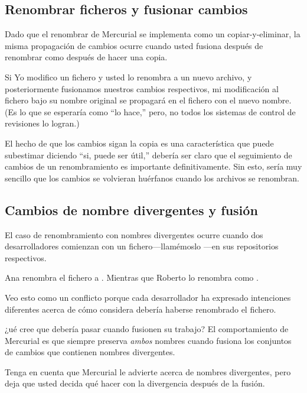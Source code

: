 \subsection{Renombrar ficheros y fusionar cambios}

Dado que el renombrar de Mercurial se implementa como un
copiar-y-eliminar, la misma propagación de cambios ocurre cuando usted
fusiona después de renombrar como después de hacer una copia.

Si Yo modifico un fichero y usted lo renombra a un nuevo archivo, y
posteriormente fusionamos nuestros cambios respectivos, mi
modificación al fichero bajo su nombre original se propagará en el
fichero con el nuevo nombre. (Es lo que se esperaría como ``lo hace,''
pero, no todos los sistemas de control de revisiones lo logran.)

El hecho de que los cambios sigan la copia es una característica que
puede subestimar diciendo ``si, puede ser útil,'' debería ser claro
que el seguimiento de cambios de un renombramiento es importante
definitivamente.  Sin esto, sería muy sencillo que los cambios se
volvieran huérfanos cuando los archivos se renombran.

\subsection{Cambios de nombre divergentes y fusión}

El caso de renombramiento con nombres divergentes ocurre cuando dos
desarrolladores comienzan  con un fichero---llamémoslo
---en sus repositorios respectivos.

Ana renombra el fichero a .
Mientras que Roberto lo renombra como .

Veo esto como un conflicto porque cada desarrollador ha expresado
intenciones diferentes acerca de cómo considera debería haberse
renombrado el fichero.

¿ué cree que debería pasar cuando fusionen su trabajo?
El comportamiento de Mercurial es que siempre preserva \emph{ambos}
nombres cuando fusiona  los conjuntos de cambios que contienen nombres
divergentes.

Tenga en cuenta que Mercurial le advierte acerca de nombres
divergentes, pero deja que usted decida qué hacer con la divergencia
después de la fusión.

